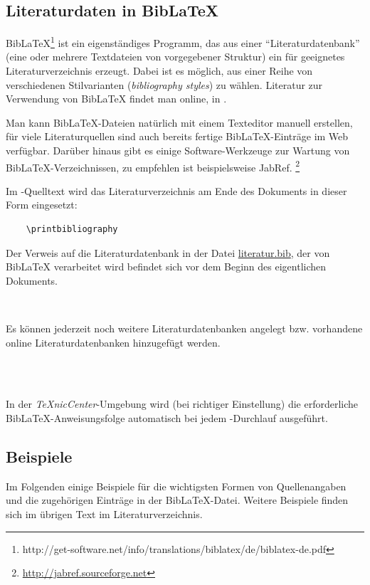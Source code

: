 \subsection{Literaturdaten in BibLaTeX}
\label{sec:bibtex}

BibLaTeX\footnote{http://get-software.net/info/translations/biblatex/de/biblatex-de.pdf} ist ein eigenständiges Programm, das aus einer "`Literaturdatenbank"' (eine oder mehrere
Textdateien von vorgegebener Struktur) ein für \latex geeignetes Literaturverzeichnis
erzeugt. Dabei ist es möglich, aus einer Reihe von verschiedenen Stilvarianten
(\emph{bibliography styles}) zu wählen.
Literatur zur Verwendung von BibLaTeX findet man online, \zB in
\cite{Taylor96,Patashnik88}.

Man kann BibLaTeX-Dateien natürlich mit einem Texteditor manuell erstellen, für
viele Literaturquellen sind auch bereits fertige BibLaTeX-Einträge im Web verfügbar.
Darüber hinaus gibt es einige Software-Werkzeuge zur Wartung von
BibLaTeX-Verzeichnissen, zu empfehlen ist beispielsweise
JabRef.%
\footnote{\url{http://jabref.sourceforge.net}}
 
Im \latex-Quelltext wird das Literaturverzeichnis am Ende des
Dokuments in dieser Form eingesetzt:
%
\begin{verbatim}
    \printbibliography
\end{verbatim}
%
Der Verweis auf die Literaturdatenbank in der Datei
\url{literatur.bib}, der von BibLaTeX verarbeitet wird befindet sich vor dem Beginn des eigentlichen Dokuments.
%
\begin{verbatim}
    
\end{verbatim}
%
Es können jederzeit noch weitere Literaturdatenbanken angelegt bzw. vorhandene online Literaturdatenbanken hinzugefügt werden. 
%
\begin{verbatim}
    
    
\end{verbatim}
%
In der \emph{TeXnicCenter}-Umgebung wird (bei richtiger Einstellung) die
erforderliche BibLaTeX-Anweisungsfolge automatisch bei jedem \latex-Durchlauf
ausgeführt.




\subsection{Beispiele}
Im Folgenden einige Beispiele für die wichtigsten Formen von Quellenangaben
und die zugehörigen Einträge in der BibLaTeX-Datei.
Weitere Beispiele finden sich im übrigen Text \bzw im
Literaturverzeichnis.


